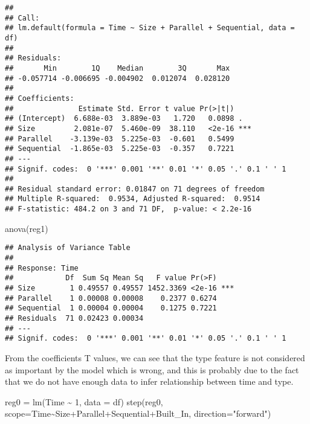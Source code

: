 \documentclass[
]{article}
\newenvironment{Shaded}{\begin{snugshade}}{\end{snugshade}}
\newcommand{\AttributeTok}[1]{\textcolor[rgb]{0.77,0.63,0.00}{#1}}
\newcommand{\DecValTok}[1]{\textcolor[rgb]{0.00,0.00,0.81}{#1}}
\newcommand{\FunctionTok}[1]{\textcolor[rgb]{0.00,0.00,0.00}{#1}}
\newcommand{\NormalTok}[1]{#1}
\newcommand{\OtherTok}[1]{\textcolor[rgb]{0.56,0.35,0.01}{#1}}
\newcommand{\SpecialCharTok}[1]{\textcolor[rgb]{0.00,0.00,0.00}{#1}}
\newcommand{\StringTok}[1]{\textcolor[rgb]{0.31,0.60,0.02}{#1}}
\begin{document}
\begin{verbatim}
## 
## Call:
## lm.default(formula = Time ~ Size + Parallel + Sequential, data = df)
## 
## Residuals:
##       Min        1Q    Median        3Q       Max 
## -0.057714 -0.006695 -0.004902  0.012074  0.028120 
## 
## Coefficients:
##               Estimate Std. Error t value Pr(>|t|)    
## (Intercept)  6.688e-03  3.889e-03   1.720   0.0898 .  
## Size         2.081e-07  5.460e-09  38.110   <2e-16 ***
## Parallel    -3.139e-03  5.225e-03  -0.601   0.5499    
## Sequential  -1.865e-03  5.225e-03  -0.357   0.7221    
## ---
## Signif. codes:  0 '***' 0.001 '**' 0.01 '*' 0.05 '.' 0.1 ' ' 1
## 
## Residual standard error: 0.01847 on 71 degrees of freedom
## Multiple R-squared:  0.9534, Adjusted R-squared:  0.9514 
## F-statistic: 484.2 on 3 and 71 DF,  p-value: < 2.2e-16
\end{verbatim}

\begin{Shaded}
\begin{Highlighting}[]
\FunctionTok{anova}\NormalTok{(reg1)}
\end{Highlighting}
\end{Shaded}

\begin{verbatim}
## Analysis of Variance Table
## 
## Response: Time
##            Df  Sum Sq Mean Sq   F value Pr(>F)    
## Size        1 0.49557 0.49557 1452.3369 <2e-16 ***
## Parallel    1 0.00008 0.00008    0.2377 0.6274    
## Sequential  1 0.00004 0.00004    0.1275 0.7221    
## Residuals  71 0.02423 0.00034                     
## ---
## Signif. codes:  0 '***' 0.001 '**' 0.01 '*' 0.05 '.' 0.1 ' ' 1
\end{verbatim}

From the coefficients T values, we can see that the type feature is not
considered as important by the model which is wrong, and this is
probably due to the fact that we do not have enough data to infer
relationship between time and type.

\begin{Shaded}
\begin{Highlighting}[]
\NormalTok{reg0 }\OtherTok{=} \FunctionTok{lm}\NormalTok{(Time }\SpecialCharTok{\textasciitilde{}} \DecValTok{1}\NormalTok{, }\AttributeTok{data =}\NormalTok{ df)}
\FunctionTok{step}\NormalTok{(reg0, }\AttributeTok{scope=}\NormalTok{Time}\SpecialCharTok{\textasciitilde{}}\NormalTok{Size}\SpecialCharTok{+}\NormalTok{Parallel}\SpecialCharTok{+}\NormalTok{Sequential}\SpecialCharTok{+}\NormalTok{Built\_In, }\AttributeTok{direction=}\StringTok{"forward"}\NormalTok{)}
\end{Highlighting}
\end{Shaded}
\end{document}
